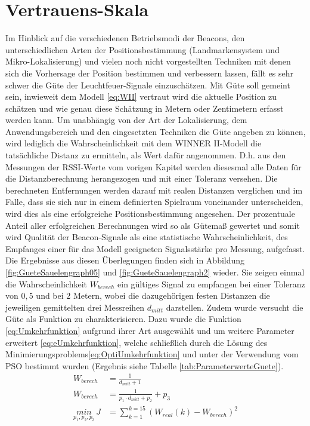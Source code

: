 \section{Vertrauens-Skala}
Im Hinblick auf die verschiedenen Betriebsmodi der Beacons, den unterschiedlichen Arten der Positionsbestimmung (Landmarkensystem und Mikro-Lokalisierung) und vielen noch nicht vorgestellten Techniken mit denen sich die Vorhersage der Position bestimmen und verbessern lassen, fällt es sehr schwer die Güte der Leuchtfeuer-Signale einzuschätzen. Mit Güte soll gemeint sein, inwieweit dem Modell \ref{eq:WII} vertraut wird die aktuelle Position zu schätzen und wie genau diese Schätzung in Metern oder Zentimetern erfasst werden kann. Um unabhängig von der Art der Lokalisierung, dem Anwendungsbereich und den eingesetzten Techniken die Güte angeben zu können, wird lediglich die Wahrscheinlichkeit mit dem WINNER II-Modell die tatsächliche Distanz zu ermitteln, als Wert dafür angenommen. D.h. aus den Messungen der RSSI-Werte vom vorigen Kapitel werden diesesmal alle Daten für die Distanzberechnung herangezogen und mit einer Toleranz versehen. Die berechneten Entfernungen werden darauf mit realen Distanzen verglichen und im Falle, dass sie sich nur in einem definierten Spielraum voneinander unterscheiden, wird dies als eine erfolgreiche Positionsbestimmung angesehen. Der prozentuale Anteil aller erfolgreichen Berechnungen wird so als Gütemaß gewertet und somit wird Qualität der Beacon-Signale als eine statistische Wahrscheinlichkeit, des Empfanges einer für das Modell geeigneten Signalsstärke pro Messung, aufgefasst. Die Ergebnisse aus diesen Überlegungen finden sich in Abbildung \ref{fig:GueteSauelengraph05} und \ref{fig:GueteSauelengraph2} wieder. Sie zeigen einmal die Wahrscheinlichkeit $W_{berech}$ ein gültiges Signal zu empfangen bei einer Toleranz von $0,5$ und bei $2$ Metern, wobei die dazugehörigen festen Distanzen die jeweiligen gemittelten drei Messreihen $d_{mitt}$ darstellen. Zudem wurde versucht die Güte als Funktion zu charakterisieren. Dazu wurde die Funktion \ref{eq:Umkehrfunktion} aufgrund ihrer Art ausgewählt und um weitere Parameter erweitert \ref{eq:eUmkehrfunktion}, welche schließlich durch die Lösung des Minimierungsproblems\ref{eq:OptiUmkehrfunktion} und unter der Verwendung vom PSO bestimmt wurden (Ergebnis siehe Tabelle \ref{tab:ParameterwerteGuete}).
\begin{align}
W_{berech}&=\frac{1}{d_{mitt}+1} \label{eq:Umkehrfunktion}\\
W_{berech}&=\frac{1}{p_1\cdot d_{mitt}+p_2} + p_3 \label{eq:eUmkehrfunktion}\\
\underset{p_1,p_2,p_3}{min}\, J&=\sum_{k=1}^{k=15}\left ( W_{real}\left ( k \right ) - W_{berech} \right )^{2} \label{eq:OptiUmkehrfunktion}
\end{align}
